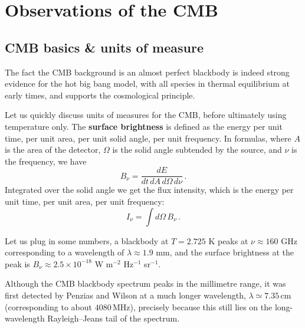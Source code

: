 \chapter{Observations of the CMB}



\section{CMB basics \& units of measure}

The fact the CMB background is an almost perfect blackbody is indeed strong evidence for the hot big bang model, with all species in thermal equilibrium at early times, and supports the cosmological principle. 

Let us quickly discuss units of measures for the CMB, before ultimately using temperature only.
The \textbf{surface brightness} is defined as the energy per unit time, per unit area, per unit solid angle, per unit frequency.
In formulas, where $A$ is the area of the detector, $\Omega$ is the solid angle subtended by the source, and $\nu$ is the frequency, we have
\begin{equation}
    B_\nu = \frac{dE}{dt\, dA\, d\Omega\, d\nu} \,.
\end{equation}
Integrated over the solid angle we get the flux intensity, which is the energy per unit time, per unit area, per unit frequency:
\begin{equation}
    I_\nu = \int d\Omega\, B_\nu \,.
\end{equation}

Let us plug in some numbers, a blackbody at $T=2.725$ K peaks at $\nu \approx 160$ GHz corresponding to a wavelength of $\lambda \approx 1.9$ mm, and the surface brightness at the peak is $B_\nu \approx 2.5 \times 10^{-18}$ W m$^{-2}$ Hz$^{-1}$ sr$^{-1}$.

Although the CMB blackbody spectrum peaks in the millimetre range, it was first detected by Penzias and Wilson at a much longer wavelength, $\lambda \simeq 7.35\,\mathrm{cm}$ (corresponding to about $4080\,\mathrm{MHz}$), precisely because this still lies on the long-wavelength Rayleigh--Jeans tail of the spectrum.

